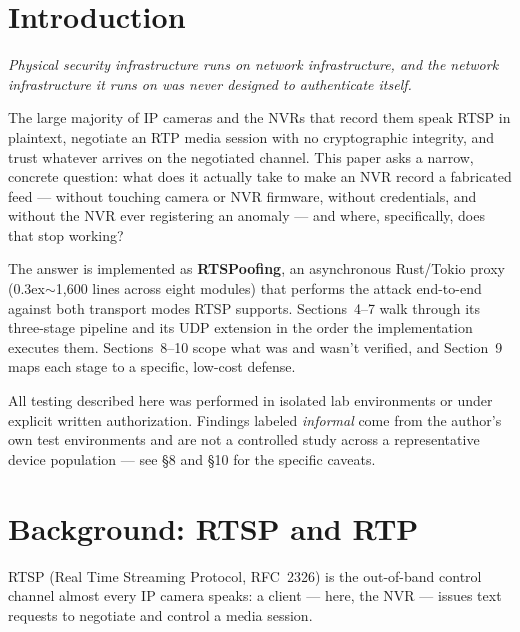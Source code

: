 \documentclass[11pt,a4paper]{article}
\begin{document}
\clearpage
\thispagestyle{empty}
{\small\tableofcontents}

\section{Introduction}
\emph{Physical security infrastructure runs on network infrastructure, and the network infrastructure it runs on was never designed to authenticate itself.}

The large majority of IP cameras and the NVRs that record them speak RTSP in plaintext, negotiate an RTP media session with no cryptographic integrity, and trust whatever arrives on the negotiated channel. This paper asks a narrow, concrete question: what does it actually take to make an NVR record a fabricated feed --- without touching camera or NVR firmware, without credentials, and without the NVR ever registering an anomaly --- and where, specifically, does that stop working?

The answer is implemented as \textbf{RTSPoofing}, an asynchronous Rust/Tokio proxy (\raise0.3ex\hbox{$\scriptstyle\sim$}1{,}600 lines across eight modules) that performs the attack end-to-end against both transport modes RTSP supports. Sections~4--7 walk through its three-stage pipeline and its UDP extension in the order the implementation executes them. Sections~8--10 scope what was and wasn't verified, and Section~9 maps each stage to a specific, low-cost defense.

\begin{notebox}[SCOPE]
All testing described here was performed in isolated lab environments or under explicit written authorization. Findings labeled \emph{informal} come from the author's own test environments and are not a controlled study across a representative device population --- see \S8 and \S10 for the specific caveats.
\end{notebox}

\section{Background: RTSP and RTP}
RTSP (Real Time Streaming Protocol, RFC~2326) is the out-of-band control channel almost every IP camera speaks: a client --- here, the NVR --- issues text requests to negotiate and control a media session.
\end{document}
